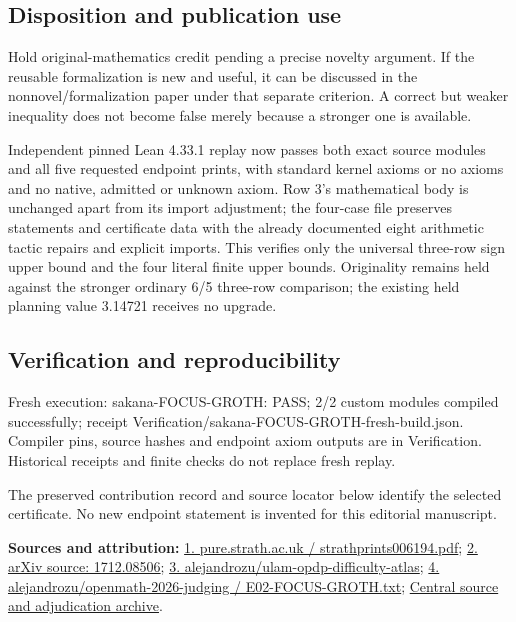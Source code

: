 \documentclass[11pt,a4paper]{article}
\begin{document}
\subsection{Disposition and publication use}
Hold original-mathematics credit pending a precise novelty argument. If the reusable formalization is new and useful, it can be discussed in the nonnovel/formalization paper under that separate criterion. A correct but weaker inequality does not become false merely because a stronger one is available.

Independent pinned Lean 4.33.1 replay now passes both exact source modules and all five requested endpoint prints, with standard kernel axioms or no axioms and no native, admitted or unknown axiom. Row 3's mathematical body is unchanged apart from its import adjustment; the four-case file preserves statements and certificate data with the already documented eight arithmetic tactic repairs and explicit imports. This verifies only the universal three-row sign upper bound and the four literal finite upper bounds. Originality remains held against the stronger ordinary 6/5 three-row comparison; the existing held planning value 3.14721 receives no upgrade.

\subsection{Verification and reproducibility}
Fresh execution: sakana-FOCUS-GROTH: PASS; 2/2 custom modules compiled successfully; receipt Verification/sakana-FOCUS-GROTH-fresh-build.json. Compiler pins, source hashes and endpoint axiom outputs are in Verification. Historical receipts and finite checks do not replace fresh replay.

The preserved contribution record and source locator below identify the selected certificate. No new endpoint statement is invented for this editorial manuscript.

{\small\textbf{Sources and attribution:} \href{https://pure.strath.ac.uk/ws/portalfiles/portal/73870999/strathprints006194.pdf}{1. pure.strath.ac.uk / strathprints006194.pdf}; \href{https://arxiv.org/html/1712.08506}{2. arXiv source: 1712.08506}; \href{https://github.com/alejandrozu/ulam-opdp-difficulty-atlas}{3. alejandrozu/ulam-opdp-difficulty-atlas}; \href{https://github.com/alejandrozu/openmath-2026-judging/blob/d0ed487f487fa7ec814ff705ab55249983fe8707/OpenMath-Judging/review/entries/E02-FOCUS-GROTH.txt}{4. alejandrozu/openmath-2026-judging / E02-FOCUS-GROTH.txt}; \href{https://github.com/alejandrozu/openmath-2026-judging}{Central source and adjudication archive}.\par}
\end{document}

